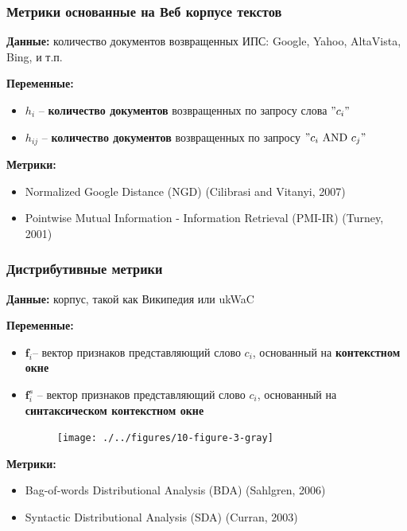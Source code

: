\documentclass{beamer}
\begin{document}
\begin{frame}
\frametitle{Метрики основанные на Веб корпусе текстов }

\textbf{Данные:} количество документов возвращенных ИПС: Google, 
Yahoo, AltaVista, Bing, и т.п.
	
\textbf{Переменные:} 
\begin{itemize}
	\item $h_i$ -- \textbf{количество документов} возвращенных по запросу слова
	$"c_i"$
	\item $h_{ij}$ -- \textbf{количество документов} возвращенных по запросу $"c_i \text{ AND } c_j"$
\end{itemize}

\textbf{Метрики:} 
\begin{itemize}
\item Normalized Google Distance (NGD) (Cilibrasi and Vitanyi, 2007)
\item Pointwise Mutual Information - Information Retrieval (PMI-IR) (Turney,
2001)
\end{itemize}
\end{frame}

\begin{frame}
\frametitle{Дистрибутивные метрики}


\textbf{Данные:} корпус, такой как Википедия или ukWaC

	
\textbf{Переменные:} 
\begin{itemize}
  \item $\textbf{f}_i$-- вектор признаков представляющий слово $c_i$, основанный на \textbf{контекстном окне}
  \item $ \mathbf{f}^s_i$ -- вектор признаков представляющий слово $c_i$, основанный на \textbf{синтаксическом контекстном окне}
  \begin{figure}
         \centering
         \texttt{[image: ./../figures/10-figure-3-gray]}
 \end{figure}
   
\end{itemize}
	
\textbf{Метрики:}
\begin{itemize}
	\item Bag-of-words Distributional Analysis (BDA) (Sahlgren, 2006)
	\item Syntactic Distributional Analysis (SDA) (Curran, 2003)
\end{itemize}	
\end{frame}
	
\end{document}
